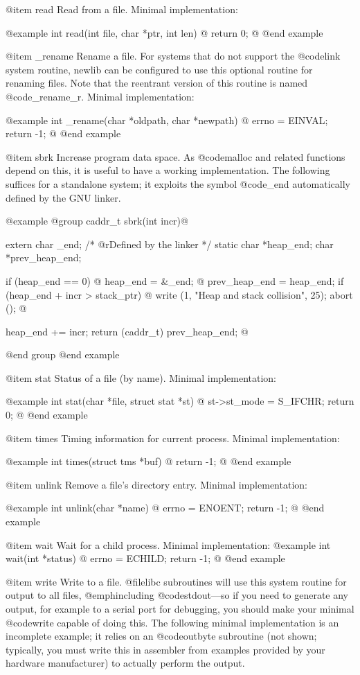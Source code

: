 @item read
Read from a file.  Minimal implementation:

@example
int read(int file, char *ptr, int len) @{
  return 0;
@}
@end example

@item _rename
Rename a file.  For systems that do not support the @code{link} system
routine, newlib can be configured to use this optional routine for
renaming files.  Note that the reentrant version of this routine is
named @code{_rename_r}.  Minimal implementation:

@example
int _rename(char *oldpath, char *newpath) @{
  errno = EINVAL;
  return -1;
@}
@end example

@item sbrk
Increase program data space.  As @code{malloc} and related functions
depend on this, it is useful to have a working implementation.  The
following suffices for a standalone system; it exploits the symbol
@code{_end} automatically defined by the GNU linker.

@example
@group
caddr_t sbrk(int incr)@{
  extern char _end;		/* @r{Defined by the linker} */
  static char *heap_end;
  char *prev_heap_end;
 
  if (heap_end == 0) @{
    heap_end = &_end;
  @}
  prev_heap_end = heap_end;
  if (heap_end + incr > stack_ptr) @{
    write (1, "Heap and stack collision\n", 25);
    abort ();
  @}

  heap_end += incr;
  return (caddr_t) prev_heap_end;
@}
@end group
@end example

@item stat
Status of a file (by name).  Minimal implementation:

@example
int stat(char *file, struct stat *st) @{
  st->st_mode = S_IFCHR;
  return 0;
@}
@end example

@item times
Timing information for current process.  Minimal implementation:

@example
int times(struct tms *buf) @{
  return -1;
@}
@end example

@item unlink
Remove a file's directory entry.  Minimal implementation:

@example
int unlink(char *name) @{
  errno = ENOENT;
  return -1; 
@}
@end example

@item wait
Wait for a child process.  Minimal implementation:
@example
int wait(int *status) @{
  errno = ECHILD;
  return -1;
@}
@end example

@item write
Write to a file.  @file{libc} subroutines will use this
system routine for output to all files, @emph{including}
@code{stdout}---so if you need to generate any output, for example to a
serial port for debugging, you should make your minimal @code{write}
capable of doing this.  The following minimal implementation is an
incomplete example; it relies on an @code{outbyte} subroutine (not
shown; typically, you must write this in assembler from examples
provided by your hardware manufacturer) to actually perform the output.

